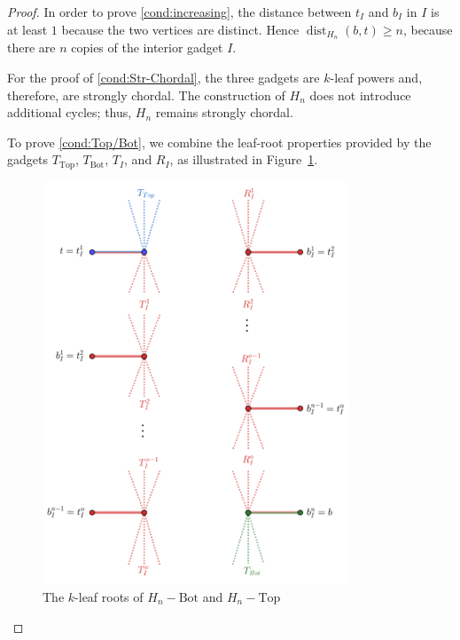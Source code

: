 \documentclass[11pt,letter]{article}
\theoremstyle{remark}
\newcommand{\T}{\text{Top}}
\newcommand{\B}{\text{Bot}}
\DeclareMathOperator{\dist}{dist}
\begin{document}
\begin{proof}
In order to prove \ref{cond:increasing}, the distance between $t_I$ and $b_I$ in $I$ is at least $1$ because the two vertices are distinct. Hence $\dist_{H_n}(b,t) \geq n$, because there are $n$ copies of the interior gadget $I$.

For the proof of \ref{cond:Str-Chordal}, the three gadgets are $k$-leaf powers and, therefore, are strongly chordal. The construction of $H_n$ does not introduce additional cycles; thus, $H_n$ remains strongly chordal.

To prove \ref{cond:Top/Bot}, we combine the leaf-root properties provided by the gadgets $T_{\T}$, $T_{\B}$, $T_I$, and $R_I$, as illustrated in Figure~\ref{fig:Trees}.
\begin{figure}[h!]
    \centering
    \includegraphics[height=12cm]{Trees.png}
    \caption{The $k$-leaf roots of  $H_n - \B$ and $H_n - \T$}\label{fig:Trees}
\end{figure}



\end{proof}
\end{document}
